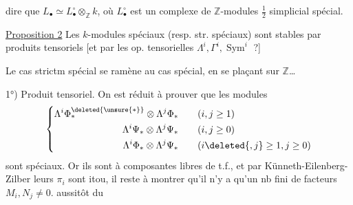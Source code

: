 dire que $L_{\bullet}\simeq L_{\bullet}^{\circ}\otimes_{\mathbb Z}k$, où $L_{\bullet}^{\circ}$ est un complexe de $\mathbb Z$-modules $\frac12$ simplicial spécial.

\uline{Proposition 2} Les $k$-modules  spéciaux (resp. str. spéciaux) sont stables par produits tensoriels [et par les op. tensorielles $\Lambda^i,\Gamma^i,\operatorname{Sym}^i$ ?]

Le cas strictm spécial se ramène au cas spécial, en se plaçant sur $\mathbb Z$\ldots

1°) Produit tensoriel. On est réduit à prouver que les modules
\[
\left\{\begin{aligned}
\Lambda^i\Phi_*^{\deleted{\unsure{*}}}\otimes\Lambda^j\Phi_* &\qquad(i,j\geq1)\\
\Lambda^i\Psi_*\otimes\Lambda^j\Psi_* &\qquad(i,j\geq0)\\
\Lambda^i\Phi_*\otimes\Lambda^j\Psi_* &\qquad(i\deleted{,j}\geq1,j\geq0)
\end{aligned}\right.
\]
sont spéciaux. Or ils sont à composantes libres de t.f., et par Künneth-Eilenberg-Zilber leurs $\pi_i$ sont itou, il reste à montrer qu'il n'y a qu'un nb fini de facteurs $M_i,N_j\ne0$.    aussitôt du

